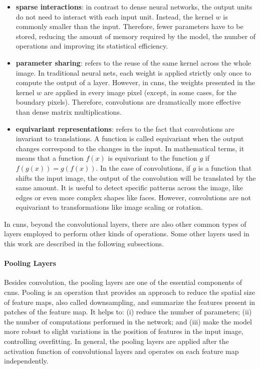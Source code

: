 \begin{itemize}
\item \textbf{sparse interactions}: in contrast to dense neural networks, the output units do not need to interact with each input unit. Instead, the kernel $w$ is commonly smaller than the input. Therefore, fewer parameters have to be stored, reducing the amount of memory required by the model, the number of operations and improving its statistical efficiency.

\item \textbf{parameter sharing}: refers to the reuse of the same kernel across the whole image. In traditional neural nets, each weight is applied strictly only once to compute the output of a layer. However, in \acsp{cnn}, the weights presented in the kernel $w$ are applied in every image pixel (except, in some cases, for the boundary pixels). Therefore, convolutions are dramatically more effective than dense matrix multiplications.

\item \textbf{equivariant representations}: refers to the fact that convolutions are invariant to translations. A function is called equivariant when the output changes correspond to the changes in the input. In mathematical terms, it means that a function $f(x)$ is equivariant to the function $g$ if $f(g(x)) = g(f(x))$. In the case of convolutions, if $g$ is a function that shifts the input image, the output of the convolution will be translated by the same amount. It is useful to detect specific patterns across the image, like edges or even more complex shapes like faces. However, convolutions are not equivariant to transformations like image scaling or rotation.
\end{itemize}

In \aclp{cnn}, beyond the convolutional layers, there are also other common types of layers employed to perform other kinds of operations. Some other layers used in this work are described in the following subsections.

\paragraph{Pooling Layers}

Besides convolution, the pooling layers are one of the essential components of \aclp{cnn}. Pooling is an operation that provides an approach to reduce the spatial size of feature maps, also called downsampling, and summarize the features present in patches of the feature map. It helps to: (i) reduce the number of parameters; (ii) the number of computations performed in the network; and (iii) make the model more robust to slight variations in the position of features in the input image, controlling overfitting. In general, the pooling layers are applied after the activation function of convolutional layers and operates on each feature map independently.

